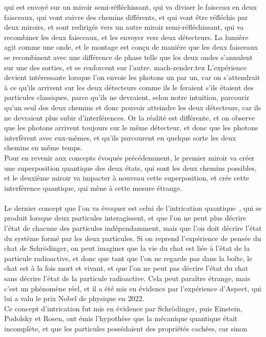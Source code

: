 qui est envoyé sur un miroir semi-réfléchissant, qui va diviser le faisceau en deux faisceaux, qui vont suivre
des chemins différents, et qui vont être réfléchis par deux miroirs, et sont redirigés vers un autre miroir
semi-réfléchissant, qui va recombiner les deux faisceaux, et les envoyer vers deux détecteurs.
La lumière agit comme une onde, et le montage est conçu de manière que les deux faisceaux se recombinent
avec une différence de phase telle que les deux ondes s'annulent sur une des sorties, et se renforcent sur
l'autre.
{mach-zender.tex}
L'expérience devient intéressante lorsque l'on envoie les photons un par un, car on s'attendrait à ce qu'ils
arrivent sur les deux détecteurs comme ils le feraient s'ils étaient des particules classiques, parce qu'ils ne devraient,
selon notre intuition, parcourir qu'un seul des deux chemins et donc pouvoir atteindre les deux détecteurs, car
ils ne devraient plus subir d'interférences.
Or la réalité est différente, et on observe que les photons arrivent toujours sur le même détecteur, et donc
que les photons interfèrent avec eux-mêmes, et qu'ils parcourent en quelque sorte les deux chemins en même temps.\\
Pour en revenir aux concepts évoqués précédemment, le premier miroir va créer une superposition quantique des
deux états, qui sont les deux chemins possibles, et le deuxième miroir va impacter à nouveau cette superposition,
et crée cette interférence quantique, qui mène à cette mesure étrange.\\ \\
Le dernier concept que l'on va évoquer est celui de l'intrication quantique~\cite{wiki:entenglement}, qui se produit lorsque deux
particules interagissent, et que l'on ne peut plus décrire l'état de chacune des particules indépendamment,
mais que l'on doit décrire l'état du système formé par les deux particules.
Si on reprend l'expérience de pensée du chat de Schrödinger, on peut imaginer que la vie du chat est liée à
l'état de la particule radioactive, et donc que tant que l'on ne regarde pas dans la boîte, le chat est à la
fois mort et vivant, et que l'on ne peut pas décrire l'état du chat sans décrire l'état de la particule radioactive.
Cela peut paraître étrange, mais c'est un phénomène réel, et il a été mis en évidence par l'expérience d'Aspect,
qui lui a valu le prix Nobel de physique en 2022.\\
Ce concept d'intrication fut mis en évidence par Schrödinger, puis Einstein, Podolsky et Rosen, ont émis l'hypothèse
que la mécanique quantique était incomplète, et que les particules possédaient des propriétés cachées, car sinon
